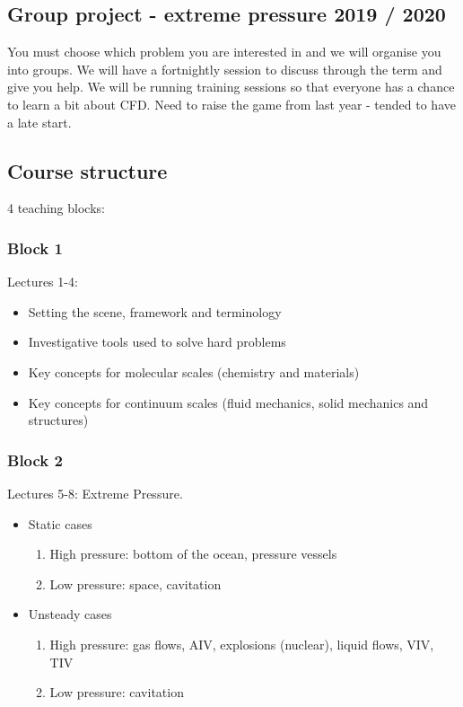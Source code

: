 \subsection{Group project - extreme pressure 2019 / 2020}
You must choose which problem you are interested in and we will organise you into groups. We will have a fortnightly session to discuss through the term and give you help. We will be running training sessions so that everyone has a chance to learn a bit about CFD. Need to raise the game from last year - tended to have a late start.
\subsection{Course structure}
4 teaching blocks:
\subsubsection{Block 1}
Lectures 1-4:
\begin{itemize}
    \item Setting the scene, framework and terminology
    \item Investigative tools used to solve hard problems
    \item Key concepts for molecular scales (chemistry and materials)
    \item Key concepts for continuum scales (fluid mechanics, solid mechanics and structures)
\end{itemize}
\subsubsection{Block 2}
Lectures 5-8: Extreme Pressure.
\begin{itemize}
    \item Static cases
          \begin{enumerate}
              \item High pressure: bottom of the ocean, pressure vessels
              \item Low pressure: space, cavitation
          \end{enumerate}
    \item Unsteady cases
          \begin{enumerate}
              \item High pressure: gas flows, AIV, explosions (nuclear), liquid flows, VIV, TIV
              \item Low pressure: cavitation
          \end{enumerate}
\end{itemize}
